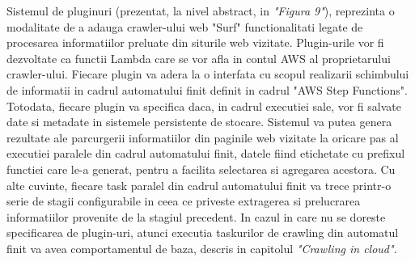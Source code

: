 Sistemul de pluginuri (prezentat, la nivel abstract, in \textit{"Figura 9"}), reprezinta o modalitate de a adauga crawler-ului web "Surf" functionalitati legate de procesarea informatiilor preluate din siturile web vizitate. Plugin-urile vor fi dezvoltate ca functii Lambda care se vor afla in contul AWS al proprietarului crawler-ului. Fiecare plugin va adera la o interfata cu scopul realizarii schimbului de informatii in cadrul automatului finit definit in cadrul "AWS Step Functions". Totodata, fiecare plugin va specifica daca, in cadrul executiei sale, vor fi salvate date si metadate in sistemele persistente de stocare. Sistemul va putea genera rezultate ale parcurgerii informatiilor din paginile web vizitate la oricare pas al executiei paralele din cadrul automatului finit, datele fiind etichetate cu prefixul functiei  care le-a generat, pentru a facilita selectarea si agregarea acestora. Cu alte cuvinte, fiecare task paralel din cadrul automatului finit va trece printr-o serie de stagii configurabile in ceea ce priveste extragerea si prelucrarea informatiilor provenite de la stagiul precedent. In cazul in care nu se doreste specificarea de plugin-uri, atunci executia taskurilor de crawling din automatul finit va avea comportamentul de baza, descris in capitolul \textit{"Crawling in cloud"}.